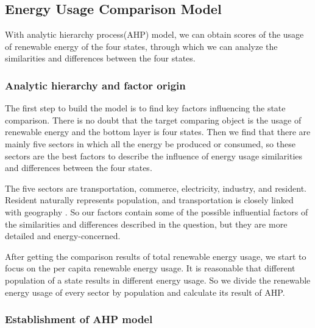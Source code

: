 \documentclass[a4paper,11pt]{article}
\begin{document}
\subsection{Energy Usage Comparison Model}

\par With analytic hierarchy process(AHP) model, we can obtain scores of the usage of renewable energy of the four states, through which we can analyze the similarities and differences between the four states. 
\subsubsection{Analytic hierarchy and factor origin}

\par The first step to build the model is to find key factors influencing the state comparison. There is no doubt that the target comparing object is the usage of renewable energy and the bottom layer is four states. Then we find that there are mainly five sectors in which all the energy be produced or consumed, so these sectors are the best factors to describe the influence of energy usage similarities and differences between the four states.

\par The five sectors are transportation, commerce, electricity, industry, and resident. Resident naturally represents population, and transportation is closely linked with geography \cite{L1}. So our factors contain some of the possible influential factors of the similarities and differences described in the question, but they are more detailed and energy-concerned.

\par After getting the comparison results of total renewable energy usage, we start to focus on the per capita renewable energy usage. It is reasonable that different population of a state results in different energy usage. So we divide the renewable energy usage of every sector by population and calculate its result of AHP.

\subsubsection{Establishment of AHP model}
\end{document}
